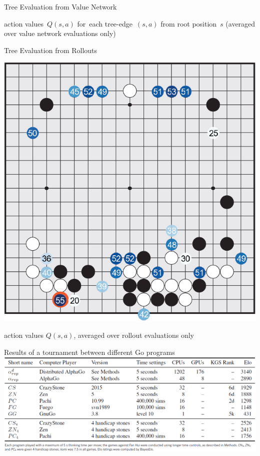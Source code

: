 \documentclass{beamer}
\begin{document}
{\begin{frame}{Tree Evaluation from Value Network}
\begin{center}
        \tiny
        action values~$Q(s, a)$ for~each tree-edge~$(s, a)$ from root position~$s$ (averaged over value network evaluations only)
      \end{center}
    \end{frame}

    \begin{frame}{Tree Evaluation from Rollouts}
      \begin{center}
        \includegraphics[height=.82\textheight]{../img/tree_eval_from_rollouts.png}

        \tiny
        action values $Q(s, a)$, averaged over rollout evaluations only
      \end{center}
    \end{frame}

    \begin{frame}{Results of a tournament between different Go programs}
      \includegraphics[width=\textwidth]{../img/results_of_the_tournament.png}
    \end{frame}

}
\end{document}
